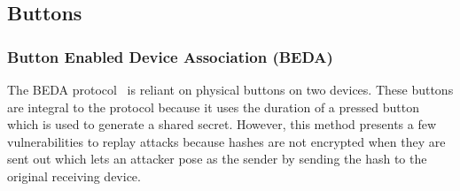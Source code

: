 

\subsection{Buttons}
\subsubsection{Button Enabled Device Association (BEDA)}
The BEDA protocol~\cite{soriente2007beda} is reliant on physical buttons on two devices.
These buttons are integral to the protocol because it uses the duration of a pressed button which is used to generate a shared secret.
However, this method presents a few vulnerabilities to replay attacks because hashes are not encrypted when they are sent out which lets an attacker pose as the sender by sending the hash to the original receiving device.



